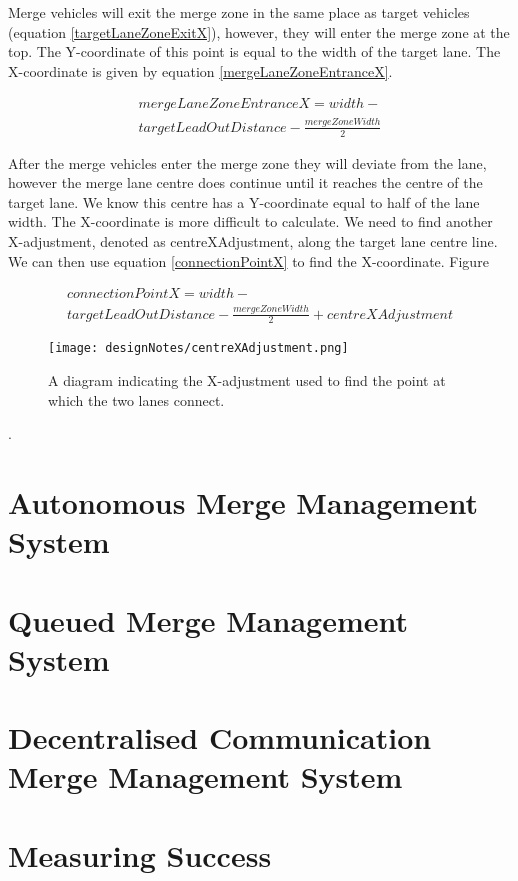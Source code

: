 Merge vehicles will exit the merge zone in the same place as target vehicles (equation \ref{targetLaneZoneExitX}), however, they will enter the merge zone at the top. The Y-coordinate of this point is equal to the width of the target lane. The X-coordinate is given by equation \ref{mergeLaneZoneEntranceX}.

\begin{multline}\label{mergeLaneZoneEntranceX}
mergeLaneZoneEntranceX = width - \\
targetLeadOutDistance - \frac{mergeZoneWidth}{2}
\end{multline}

After the merge vehicles enter the merge zone they will deviate from the lane, however the merge lane centre does continue until it reaches the centre of the target lane. We know this centre has a Y-coordinate equal to half of the lane width. The X-coordinate is more difficult to calculate. We need to find another X-adjustment, denoted as centreXAdjustment, along the target lane centre line. We can then use equation \ref{connectionPointX} to find the X-coordinate. Figure 

\begin{multline}\label{connectionPointX}
connectionPointX = width - \\
targetLeadOutDistance - \frac{mergeZoneWidth}{2} + centreXAdjustment
\end{multline}

\begin{figure}[htb]
\texttt{[image: designNotes/centreXAdjustment.png]}
\caption{A diagram indicating the X-adjustment used to find the point at which the two lanes connect.}
\label{fig:centreXAdjustment}
\end{figure}.

\section{Autonomous Merge Management System}
\label{subsec:Autonomous Merge Management System}

\section{Queued Merge Management System}
\label{subsec:Queued Merge Management System}

\section{Decentralised Communication Merge Management System}
\label{subsec:Decentralised Communication Merge Management System}

\section{Measuring Success}
\label{subsec:Measuring Success}
